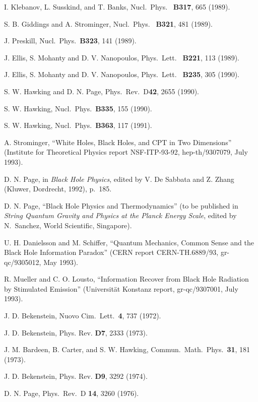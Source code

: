 \begin{thebibliography}{999}
 I. Klebanov, L. Susskind, and T. Banks, Nucl.\ Phys.\
{\bf
B317}, 665 (1989).

 S. B. Giddings and A. Strominger, Nucl.\ Phys.\ {\bf
B321}, 481
(1989).

 J. Preskill, Nucl.\ Phys.\ {\bf B323}, 141 (1989).

 J. Ellis, S. Mohanty and D. V. Nanopoulos, Phys.\
Lett.\ {\bf
B221}, 113 (1989).

 J. Ellis, S. Mohanty and D. V. Nanopoulos, Phys.\
Lett.\ {\bf
B235}, 305 (1990).

 S. W. Hawking and D. N. Page, Phys.\ Rev.\ D{\bf 42},
2655
(1990).

 S. W. Hawking, Nucl.\ Phys.\ {\bf B335}, 155 (1990).

 S. W. Hawking, Nucl.\ Phys.\ {\bf B363}, 117 (1991).

 A. Strominger, ``White Holes, Black Holes, and CPT
in Two Dimensions'' (Institute for Theoretical Physics report
NSF-ITP-93-92, hep-th/9307079, July 1993).

\bibitem{Pag92} D. N. Page, in {\em Black Hole Physics}, edited by V.
De
Sabbata and Z. Zhang (Kluwer, Dordrecht, 1992), p.~185.

 D. N. Page, ``Black Hole Physics and Thermodynamics''
(to be
published in {\em String Quantum Gravity and Physics at the Planck
Energy
Scale}, edited by N.~Sanchez, World Scientific, Singapore).

 U. H. Danielsson and M. Schiffer, ``Quantum
Mechanics,
Common Sense and the Black Hole Information Paradox'' (CERN report
CERN-TH.6889/93, gr-qc/9305012, May 1993).

\bibitem{MulLou} R. Mueller and C. O. Lousto, ``Information Recover
from
Black Hole Radiation by Stimulated Emission'' (Universit\"{a}t
Konstanz report,
gr-qc/9307001, July 1993).

 J. D. Bekenstein, Nuovo Cim.\ Lett.\ {\bf 4},
737 (1972).

\bibitem{Bek73} J. D. Bekenstein,  Phys. Rev. {\bf D7}, 2333 (1973).

 J. M. Bardeen, B. Carter, and S. W. Hawking,
Commun.\ Math.\ Phys.\ {\bf 31}, 181 (1973).

\bibitem{Bek74} J. D. Bekenstein,  Phys. Rev. {\bf D9}, 3292 (1974).

 D. N. Page, Phys.\ Rev.\ D {\bf 14}, 3260 (1976).


\end{thebibliography}

